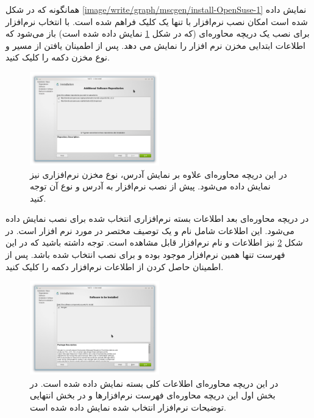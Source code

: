 همانگونه که در شکل \ref{image/write/graph/mscgen/install-OpenSuse-1} نمایش داده
شده است امکان نصب نرم‌افزار با تنها یک کلیک فراهم شده است. با انتخاب نرم‌افزار
برای نصب یک دریچه محاوره‌ای (که در شکل
\ref{image/write/graph/mscgen/install-OpenSuse-2} نمایش داده شده است) باز
می‌شود که اطلاعات ابتدایی مخزن نرم افزار را نمایش می دهد. پس از اطمینان یافتن از
مسیر و نوع مخزن دکمه  را کلیک کنید.

\begin{figure}
	\centering
	\includegraphics[width=0.5\textwidth]{image/write/graph/mscgen/install-OpenSuse-2}
	\caption[اطلاعات مخزن نرم‌افزاری برای نصب ]{
		در این دریچه محاوره‌ای علاوه بر نمایش آدرس، نوع مخزن نرم‌افزاری نیز نمایش داده
		می‌شود. پیش از نصب نرم‌افزار به آدرس و نوع آن توجه کنید.
	}
	\label{image/write/graph/mscgen/install-OpenSuse-2}
\end{figure}

در دریچه محاوره‌ای بعد اطلاعات بسته‌ نرم‌افزاری انتخاب شده برای نصب نمایش داده
می‌شود. این اطلاعات شامل نام و یک توصیف مختصر در مورد نرم افزار است. در شکل
\ref{image/write/graph/mscgen/install-OpenSuse-3} نیز اطلاعات و نام نرم‌افزار
 قابل مشاهده است. توجه داشته باشید که در این فهرست تنها همین
نرم‌افزار موجود بوده و برای نصب انتخاب شده باشد. پس از اطمینان حاصل کردن از
اطلاعات نرم‌افزار دکمه  را کلیک کنید.

\begin{figure}
	\centering
	\includegraphics[width=0.5\textwidth]{image/write/graph/mscgen/install-OpenSuse-3}
	\caption[اطلاعات نرم‌افزار ]{
		در این دریچه محاوره‌ای اطلاعات کلی بسته  نمایش داده شده است. در بخش
		اول این دریچه محاوره‌ای فهرست نرم‌افزارها و در بخش انتهایی توضیحات نرم‌افزار
		انتخاب شده نمایش داده شده است.
	}
	\label{image/write/graph/mscgen/install-OpenSuse-3}
\end{figure}

